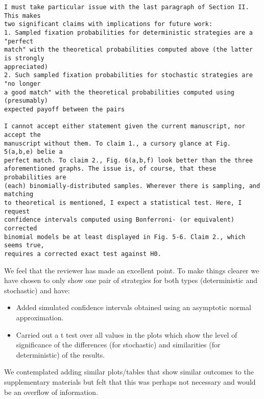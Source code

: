 \documentclass[a4]{article}
\begin{document}
\begin{verbatim}
I must take particular issue with the last paragraph of Section II. This makes
two significant claims with implications for future work:
1. Sampled fixation probabilities for deterministic strategies are a "perfect
match" with the theoretical probabilities computed above (the latter is strongly
appreciated)
2. Such sampled fixation probabilities for stochastic strategies are "no longer
a good match" with the theoretical probabilities computed using (presumably)
expected payoff between the pairs

I cannot accept either statement given the current manuscript, nor accept the
manuscript without them. To claim 1., a cursory glance at Fig. 5(a,b,e) belie a
perfect match. To claim 2., Fig. 6(a,b,f) look better than the three
aforementioned graphs. The issue is, of course, that these probabilities are
(each) binomially-distributed samples. Wherever there is sampling, and matching
to theoretical is mentioned, I expect a statistical test. Here, I request
confidence intervals computed using Bonferroni- (or equivalent) corrected
binomial models be at least displayed in Fig. 5-6. Claim 2., which seems true,
requires a corrected exact test against H0.
\end{verbatim}

We feel that the reviewer has made an excellent point. To make things clearer we
have chosen to only show one pair of strategies for both types (deterministic
and stochastic) and have:

\begin{itemize}
    \item Added simulated confidence intervals obtained using an asymptotic normal
        approximation.
    \item Carried out a t test over all values in the plots which show the level
        of significance of the differences (for stochastic) and similarities
        (for deterministic) of the results.
\end{itemize}

We contemplated adding similar plots/tables that show similar outcomes to the
supplementary materials but felt that this was perhaps not necessary and would
be an overflow of information.
\end{document}
